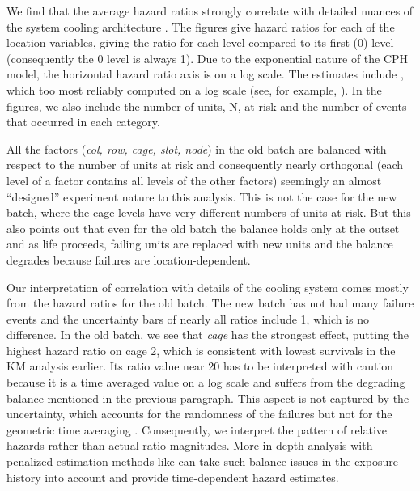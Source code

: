We find that the average hazard ratios strongly correlate with
detailed nuances of the system cooling architecture .  The figures give
hazard ratios for each of the location variables, giving the ratio for
each level compared to its first (0) level (consequently the 0 level
is always 1). Due to the exponential nature of the CPH model, the
horizontal hazard ratio axis is on a log scale. The estimates include
, which too  most reliably
computed on a log scale (see, for example, \cite{Ostrouchov88}). In
the figures, we also include the number of units, N, at risk and the
number of events that occurred in each category.

All the factors ({\em col, row, cage, slot, node}) in the old batch
are balanced with respect to the number of units at risk and
consequently nearly orthogonal (each level of a factor contains all
levels of the other factors) seemingly an almost ``designed''
experiment nature to this analysis. This is not the case for the new
batch, where the cage levels have very different numbers of units at
risk. But this also points out that even for the old batch the balance
holds only at the outset and as life proceeds, failing units are
replaced with new units and the balance degrades because failures are
location-dependent.

Our interpretation of correlation with details of the cooling system
comes mostly from the hazard ratios for the old batch. The new batch
has not had many failure events and the uncertainty bars of nearly all
ratios include 1, which is no difference. In the old batch, we see
that {\em cage} has the strongest effect, putting the highest hazard
ratio on cage 2, which is consistent with lowest survivals in the KM
analysis earlier. Its ratio value near 20 has to be interpreted with
caution because it is a time averaged value on a log scale and suffers
from the degrading balance mentioned in the previous paragraph. This
aspect is not captured by the uncertainty, which accounts for the
randomness of the failures but not for the geometric time averaging
. Consequently, we interpret the pattern of
relative hazards rather than actual ratio magnitudes. More in-depth
analysis with penalized estimation methods like \cite{bender2019} can
take such balance issues in the exposure history into account and
provide time-dependent hazard estimates.

